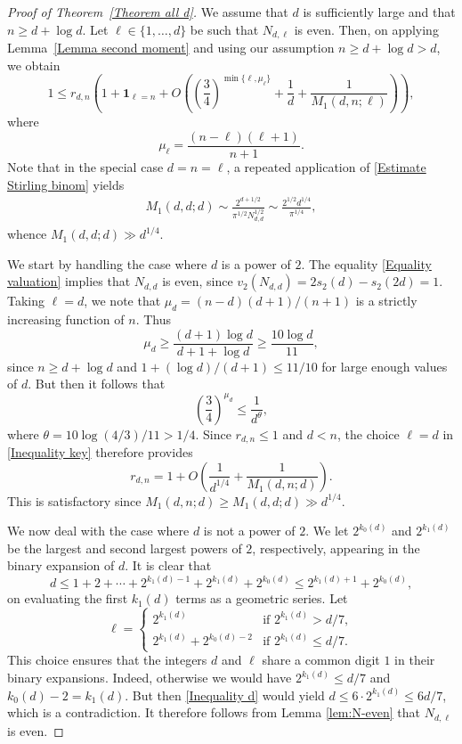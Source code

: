 \documentclass[11pt, reqno]{amsart}
\numberwithin{equation}{section}
\renewcommand{\leq}{\leqslant}
\renewcommand{\geq}{\geqslant}
\begin{document}
\begin{proof}[Proof of Theorem~\ref{Theorem all d}]
We assume that $d$ is sufficiently large and that $n\geq d+\log d$. Let $\ell \in \{1, \dots, d \}$ be  such that $N_{d,\ell}$ is even. Then, on applying Lemma~\ref{Lemma second moment} and using our assumption $n \geq d+\log d> d$, we obtain
\begin{equation}
\label{Inequality key}
1 \leq r_{d,n} \left( 1 + \boldsymbol{1}_{\ell=n} + O \left( 
\left(\frac{3}{4}\right)^{\min\{\ell,\mu_\ell\}}
+
\frac1{d} 
+\frac1{M_1(d,n;\ell)} \right) \right),
\end{equation}
where
$$
\mu_\ell=\frac{(n-\ell)(\ell+1)}{n+1}.
$$
Note that 
in the special case $d=n=\ell$, a repeated application of  \eqref{Estimate Stirling binom} yields
\begin{align*}
M_1(d,d;d)  \sim \frac{2^{d+1/2}}{\pi^{1/2} N_{d,d}^{1/2}}  
\sim \frac{2^{1/2} d^{1/4}}{\pi^{1/4}},
\end{align*}
whence $M_1(d,d;d)\gg d^{1/4}$.


We start by handling the case where $d$ is a power of $2$. 
The equality \eqref{Equality valuation} implies that $N_{d,d}$ is even, since
$
v_2(N_{d,d})=2s_2(d)-s_2(2d)=1.
$
Taking 
$\ell=d$,  we note that $\mu_d=(n-d)(d+1)/(n+1)$  is a strictly increasing function of $n$. Thus
$$
\mu_d\geq \frac{(d+1)\log d}{d+1+\log d}
\geq \frac{10\log d}{11},
$$
since $n\geq d+\log d$ and $1+(\log d)/(d+1)\leq 11/10$ for large enough values of $d$. 
But then it follows that 
$$
\left(\frac{3}{4}\right)^{\mu_d}\leq \frac{1}{d^{\theta}},
$$
where $\theta=10\log(4/3)/11>1/4$.
Since $r_{d,n}\leq 1$ and $d<n$,  the choice $\ell=d$ in  \eqref{Inequality key} therefore provides
\begin{equation*}
r_{d,n} = 1 + O \left( \frac1{d^{1/4}} + \frac1{M_1(d,n;d)} \right).
\end{equation*}
This  is satisfactory since $M_1(d,n;d) \geq M_1(d,d;d)\gg d^{1/4}$.

We now deal with the case where $d$ is not a power of $2$. We let $2^{k_0(d)}$ and $2^{k_1(d)}$ be  the largest and second largest powers of $2$, respectively,  
appearing in the binary expansion of $d$. It is clear that 
\begin{equation}
\label{Inequality d}
d \leq 1+2+\cdots+2^{k_1(d)-1} +2^{k_1(d)}+2^{k_0(d)}\leq 
2^{k_1(d)+1} + 2^{k_0(d)},
\end{equation}
on evaluating the first $k_1(d)$ terms as a geometric series. 
 Let 
\begin{equation*}
\ell =
\begin{cases}
2^{k_1(d)} & \textrm{if } 2^{k_1(d)} > d/7, \\
2^{k_1(d)} + 2^{k_0(d)-2} & \textrm{if } 2^{k_1(d)} \leq d/7.
\end{cases}
\end{equation*}
This choice ensures that the integers $d$ and $\ell$ share a common digit $1$ in their binary expansions. Indeed, otherwise we would have $2^{k_1(d)} \leq d/7$ and $k_0(d)-2 = k_1(d)$. But then \eqref{Inequality d} 
would yield $d \leq 6 \cdot 2^{k_1(d)} \leq 6d/7$, which is a contradiction.
It therefore follows from Lemma \ref{lem:N-even} that  $N_{d,\ell}$ is even. 


\end{proof}
\end{document}
